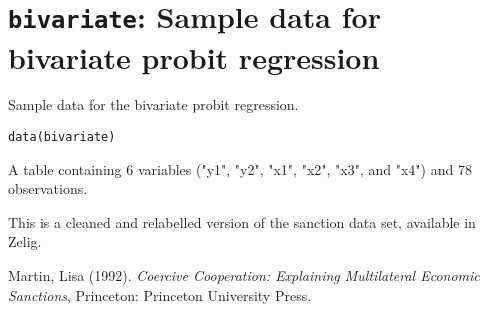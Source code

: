  \section{{\tt bivariate}: Sample data for bivariate probit regression}\label{ss:bivariate}
\begin{Description}\relax
Sample data for the bivariate probit regression.
\end{Description}
\begin{Usage}
\begin{verbatim}data(bivariate)\end{verbatim}
\end{Usage}
\begin{Format}\relax
A table containing 6 variables ("y1", "y2", "x1", 
"x2", "x3", and "x4") and 78 observations.
\end{Format}
\begin{Source}\relax
This is a cleaned and relabelled version of the sanction data
set, available in Zelig.
\end{Source}
\begin{References}\relax
Martin, Lisa (1992).  \emph{Coercive Cooperation: Explaining Multilateral
Economic Sanctions}, Princeton: Princeton University Press.
\end{References}


